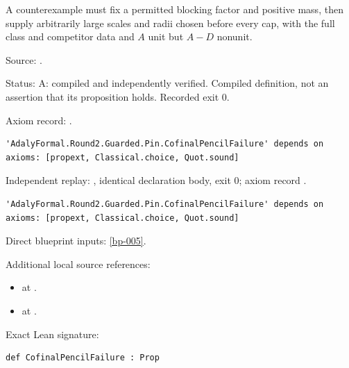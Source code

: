\begin{definition}[bp-008]
\label{bp-008}
\leanok
A counterexample must fix a permitted blocking factor and positive mass, then supply arbitrarily large scales and radii chosen before every cap, with the full class and competitor data and \(A\) unit but \(A-D\) nonunit.

\par Source: \texttt{}.
\par Status: A: compiled and independently verified. Compiled definition, not an assertion that its proposition holds. Recorded exit 0.
\par Axiom record: \texttt{}.
\begin{verbatim}
'AdalyFormal.Round2.Guarded.Pin.CofinalPencilFailure' depends on axioms: [propext, Classical.choice, Quot.sound]
\end{verbatim}
\par Independent replay: \texttt{}, identical declaration body, exit 0; axiom record \texttt{}.
\begin{verbatim}
'AdalyFormal.Round2.Guarded.Pin.CofinalPencilFailure' depends on axioms: [propext, Classical.choice, Quot.sound]
\end{verbatim}
\par Direct blueprint inputs: \ref{bp-005}.
\par Additional local source references:
\begin{itemize}
\item \texttt{} at \texttt{}.
\item \texttt{} at \texttt{}.
\end{itemize}
\par Exact Lean signature:
\begin{verbatim}
def CofinalPencilFailure : Prop
\end{verbatim}
\end{definition}

